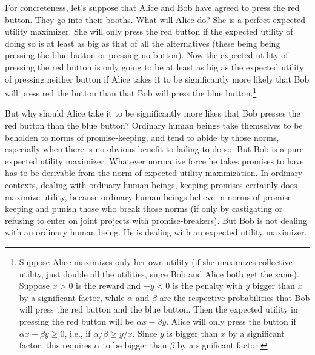For concreteness, let's suppose that Alice and Bob have agreed to press the red button. They go into their booths. 
What will Alice do? She is a perfect expected  utility maximizer. She will only press the red button if the expected
utility of doing so is at least as big as that of all the alternatives (these being being pressing the blue button or 
pressing no button). Now the expected utility of pressing the red button is only going to be at least as big as the
expected utility of pressing neither button if Alice takes it to be significantly more likely that Bob will press red
the button than that Bob will press the blue button.\footnote{Suppose Alice maximizes only her own utility (if she
maximizes collective utility, just double all the utilities, since Bob and Alice both get the same). Suppose $x>0$ is the reward and $-y<0$ is the penalty with
$y$  bigger than $x$ by a significant factor, while $\alpha$ and $\beta$ are the respective probabilities that Bob will press
the red button and the blue button. Then the expected utility in pressing the red button will be $\alpha x-\beta y$.
Alice will only press the button if $\alpha x-\beta y\ge 0$, i.e., if $\alpha/\beta \ge y/x$. Since $y$ is bigger
than $x$ by a significant factor, this requires $\alpha$ to be bigger than $\beta$ by a significant factor.} 

But why should Alice take it to be significantly more likes that Bob presses the red button than the blue button? 
Ordinary human beings take themselves to be beholden to norms of promise-keeping, and tend to abide by those norms,
especially when there is no obvious benefit to failing to do so. But Bob is a pure expected utility maximizer. Whatever
normative force he takes promises to have has to be derivable from the norm of expected utility maximization. In ordinary
contexts, dealing with ordinary human beings, keeping promises certainly does maximize utility, because ordinary human beings
believe in norms of promise-keeping and punish those who break those norms (if only by castigating or refusing to enter on
joint projects with promise-breakers). But Bob is not dealing with an ordinary human being. He is dealing with an expected 
utility maximizer. 

